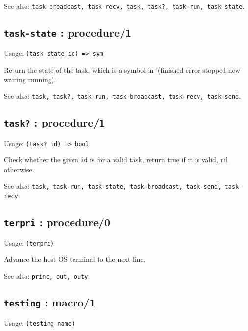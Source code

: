 \documentclass[
]{article}
\newcommand{\passthrough}[1]{#1}
\begin{document}
See also:
\passthrough{\lstinline!task-broadcast, task-recv, task, task?, task-run, task-state!}.

\hypertarget{task-state-procedure1-1}{%
\subsection{\texorpdfstring{\texttt{task-state} :
procedure/1}{task-state : procedure/1}}\label{task-state-procedure1-1}}

Usage: \passthrough{\lstinline!(task-state id) => sym!}

Return the state of the task, which is a symbol in '(finished error
stopped new waiting running).

See also:
\passthrough{\lstinline!task, task?, task-run, task-broadcast, task-recv, task-send!}.

\hypertarget{task-procedure1-3}{%
\subsection{\texorpdfstring{\texttt{task?} :
procedure/1}{task? : procedure/1}}\label{task-procedure1-3}}

Usage: \passthrough{\lstinline!(task? id) => bool!}

Check whether the given \passthrough{\lstinline!id!} is for a valid
task, return true if it is valid, nil otherwise.

See also:
\passthrough{\lstinline!task, task-run, task-state, task-broadcast, task-send, task-recv!}.

\hypertarget{terpri-procedure0-1}{%
\subsection{\texorpdfstring{\texttt{terpri} :
procedure/0}{terpri : procedure/0}}\label{terpri-procedure0-1}}

Usage: \passthrough{\lstinline!(terpri)!}

Advance the host OS terminal to the next line.

See also: \passthrough{\lstinline!princ, out, outy!}.

\hypertarget{testing-macro1-1}{%
\subsection{\texorpdfstring{\texttt{testing} :
macro/1}{testing : macro/1}}\label{testing-macro1-1}}

Usage: \passthrough{\lstinline!(testing name)!}
\end{document}
